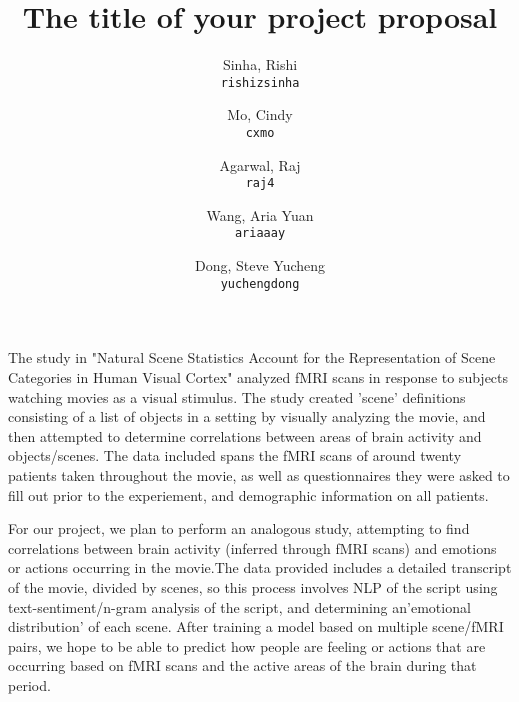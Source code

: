 \documentclass[11pt]{article}
\title{The title of your project proposal}
\author{
  Sinha, Rishi\\
  \texttt{rishizsinha}
  \and
  Mo, Cindy\\
  \texttt{cxmo}
  \and
  Agarwal, Raj\\
  \texttt{raj4}
  \and
  Wang, Aria Yuan\\
  \texttt{ariaaay}
  \and
  Dong, Steve Yucheng\\
  \texttt{yuchengdong}
}
\begin{document}
\maketitle

The study in "Natural Scene Statistics Account for the Representation of 
Scene Categories in Human Visual Cortex"\cite{stansbury2013neuron} analyzed 
fMRI scans in response to subjects watching movies as a visual stimulus.
The study created 'scene' definitions consisting of a list of objects in 
a setting by visually analyzing the movie, and then attempted to determine 
correlations between areas of brain activity and objects/scenes. The data 
included spans the fMRI scans of around twenty patients taken throughout
the movie, as well as questionnaires they were asked to fill out prior
to the experiement, and demographic information on all patients.

For our project, we plan to perform an analogous study, attempting to find
correlations between brain activity (inferred through fMRI scans) and 
emotions or actions occurring in the movie.The data provided includes 
a detailed transcript of the movie, divided by scenes, so this process 
involves NLP of the script using text-sentiment/n-gram analysis of the 
script, and determining an'emotional distribution' of each scene. After 
training a model based on multiple scene/fMRI pairs, we hope to be able to 
predict how people are feeling or actions that are occurring based on fMRI 
scans and the active areas of the brain during that period. 


\end{document}

